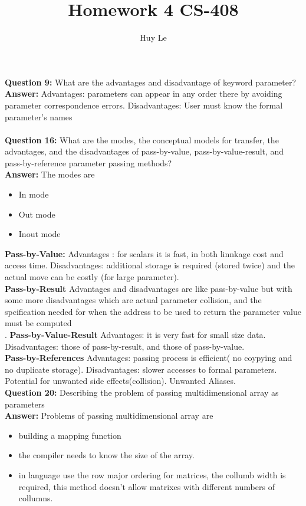 \documentclass{article}
\begin{document}
\title{Homework 4 CS-408}
\author{Huy Le }
\maketitle
\textbf{Question 9: } What are the advantages and disadvantage of keyword
parameter?\\
\textbf{Answer:} Advantages: parameters can appear in any order there by
avoiding parameter correspondence errors. Disadvantages: User must know the formal parameter's names\\
\\
\textbf{Question 16: } What are the modes, the conceptual models for transfer, the advantages, and the disadvantages of pass-by-value, pass-by-value-result, and pass-by-reference parameter passing methods?\\
\textbf{Answer: } The modes are 
\begin{itemize}
\item In mode
\item Out mode
\item Inout mode
\end{itemize}
\textbf{Pass-by-Value: } Advantages : for scalars it is fast, in both linnkage cost and access time. Disadvantages: additional storage is required (stored twice) and the actual move can be costly (for large parameter).\\
\textbf{Pass-by-Result} Advantages and disadvantages are like pass-by-value but with some more disadvantages which are actual parameter collision, and the spcification needed for when the address to be used to return the parameter value must be computed\\.
\textbf{Pass-by-Value-Result} Advantages: it is very fast for small size data. Disadvantages: those of pass-by-result, and those of pass-by-value.\\

\textbf{Pass-by-References} Advantages: passing process is efficient( no coypying and no duplicate storage). Disadvantages: slower accesses to formal parameters. Potential for unwanted side effects(collision). Unwanted Aliases.\\

\textbf{Question 20: } Describing the problem of passing multidimensional array as parameters\\
\textbf{Answer: } Problems of passing multidimensional array are\\
\begin{itemize}
\item building a mapping function
\item the compiler needs to know the size of the array. 
\item in language use the row major ordering for matrices, the collumb width is required, this method doesn't allow matrixes with different numbers of collumns.
\end{itemize}
\end{document}
